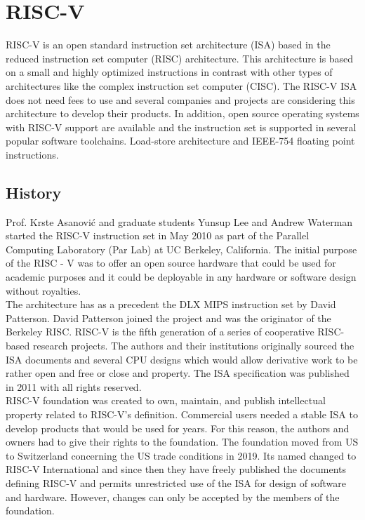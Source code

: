 \section{RISC-V}

RISC-V is an open standard instruction set architecture (ISA) based in the reduced instruction set computer (RISC) architecture. This architecture is based on a small and highly optimized instructions in contrast with other types of architectures like the complex instruction set computer (CISC). The RISC-V ISA does not need fees to use and several companies and projects  are considering this architecture to develop their products. In addition, open source operating systems with RISC-V support are available and the instruction set is supported in several popular software toolchains. Load-store architecture and IEEE-754 floating point instructions. \\

\subsection{History}

Prof. Krste Asanović and graduate students Yunsup Lee and Andrew Waterman started the RISC-V instruction set in May 2010 as part of the Parallel Computing Laboratory (Par Lab) at UC Berkeley, California. The initial purpose of the RISC - V was to offer an open source hardware that could be used for academic purposes and it could be deployable in any hardware or software design without royalties.\\

The architecture has as a precedent the DLX MIPS instruction set by David Patterson. David Patterson joined the project and was the originator of the Berkeley RISC. RISC-V is the fifth generation of a series of cooperative RISC-based research projects. The authors and their institutions originally sourced the ISA documents and several CPU designs which would allow derivative work to be rather open and free or close and property. The ISA specification was published in 2011  with all rights reserved. \\

RISC-V foundation was created to own, maintain, and publish intellectual property related to RISC-V's definition. Commercial users needed a stable ISA to develop products that would be used for years. For this reason, the authors and owners had to give their rights to the foundation. The foundation moved from US to Switzerland concerning the US trade conditions in 2019. Its named changed to RISC-V International and since then they have freely published the documents defining RISC-V and permits unrestricted use of the ISA for design of software and hardware. However, changes can only be accepted by the members of the foundation. \\

